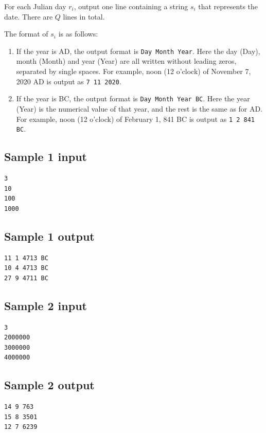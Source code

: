 \documentclass[11pt]{article}
\begin{document}
For each Julian day $r_i$, output one line containing a string $s_i$ that
represents the date.
There are $Q$ lines in total.

The format of $s_i$ is as follows:
\begin{enumerate}
\item If the year is AD, the output format is \texttt{Day Month Year}.
  Here the day (Day), month (Month) and year (Year) are all written without
  leading zeros, separated by single spaces.
  For example, noon (12 o'clock) of November 7, 2020 AD is output as
  \texttt{7 11 2020}.
\item If the year is BC, the output format is \texttt{Day Month Year BC}.
  Here the year (Year) is the numerical value of that year, and the rest is
  the same as for AD.
  For example, noon (12 o'clock) of February 1, 841 BC is output as
  \texttt{1 2 841 BC}.
\end{enumerate}

\subsection*{Sample 1 input}

\begin{verbatim}
3
10
100
1000
\end{verbatim}

\subsection*{Sample 1 output}

\begin{verbatim}
11 1 4713 BC
10 4 4713 BC
27 9 4711 BC
\end{verbatim}

\subsection*{Sample 2 input}

\begin{verbatim}
3
2000000
3000000
4000000
\end{verbatim}

\subsection*{Sample 2 output}

\begin{verbatim}
14 9 763
15 8 3501
12 7 6239
\end{verbatim}
\end{document}
